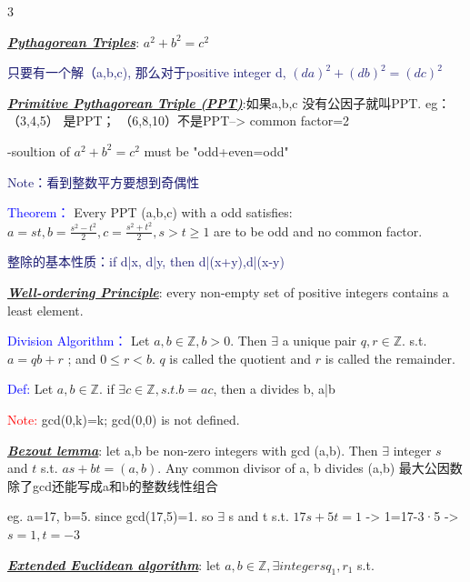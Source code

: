 \documentclass[12pt]{article}
\newcommand{\bulletPoint}[1]{\underline{\textit{\textbf{#1}}}}
\begin{document}
\singlespacing

\begin{multicols*}{3}

\tiny

\raggedright


\bulletPoint{Pythagorean Triples}:
$a^2+b^2=c^2$

{\fontsize{5.5pt}{5pt}\selectfont\textcolor{MidnightBlue}{只要有一个解（a,b,c), 那么对于positive integer d, $(da)^2+(db)^2=(dc)^2$}}

\bulletPoint{Primitive Pythagorean Triple (PPT)}:如果a,b,c 没有公因子就叫PPT.
eg：（3,4,5） 是PPT； （6,8,10）不是PPT--> common factor=2

-soultion of $a^2+b^2=c^2$ must be "odd+even=odd"

{\fontsize{5.5pt}{5pt}\selectfont\textcolor{MidnightBlue}{Note：看到整数平方要想到奇偶性}}

\textcolor{blue}{Theorem：} Every PPT (a,b,c) with a odd satisfies: $a=st, b=\frac{s^2-t^2}{2}, c=\frac{s^2+t^2}{2}, s>t\geq1$ are to be odd and no common factor.

{\fontsize{5.5pt}{5pt}\selectfont\textcolor{MidnightBlue}{整除的基本性质：if d|x, d|y, then d|(x+y),d|(x-y)}}





\bulletPoint{Well-ordering Principle}: every non-empty set of positive integers contains a least element.

\textcolor{blue}{Division Algorithm：} Let $a,b \in \mathbb{Z}, b > 0$. Then $\exists$ a unique pair $q,r \in \mathbb{Z}$. s.t. $a = qb + r$
; and $0 \leq r < b$. $q$ is called the quotient and $r$ is called the remainder.

\textcolor{blue}{Def:} Let $a,b \in \mathbb{Z}.$ if $\exists c \in \mathbb{Z}, s.t. b=ac $, then a divides b, a|b

\textcolor{red}{Note:} gcd(0,k)=k; gcd(0,0) is not defined.

\bulletPoint{Bezout lemma}: let a,b be non-zero integers with gcd (a,b). Then $\exists$ integer $s$ and $t$ s.t. $as+bt=(a,b)$. Any common divisor of a, b divides (a,b)
最大公因数除了gcd还能写成a和b的整数线性组合

eg. a=17, b=5. since gcd(17,5)=1. so $\exists$ s and t s.t. $17s+5t=1$ -> 1=17-3·5 -> $s=1, t=-3$

\bulletPoint{Extended Euclidean algorithm}: let $a,b \in \mathbb{Z}, \exists integers q_1, r_1$ s.t.


\end{multicols*}
\end{document}
